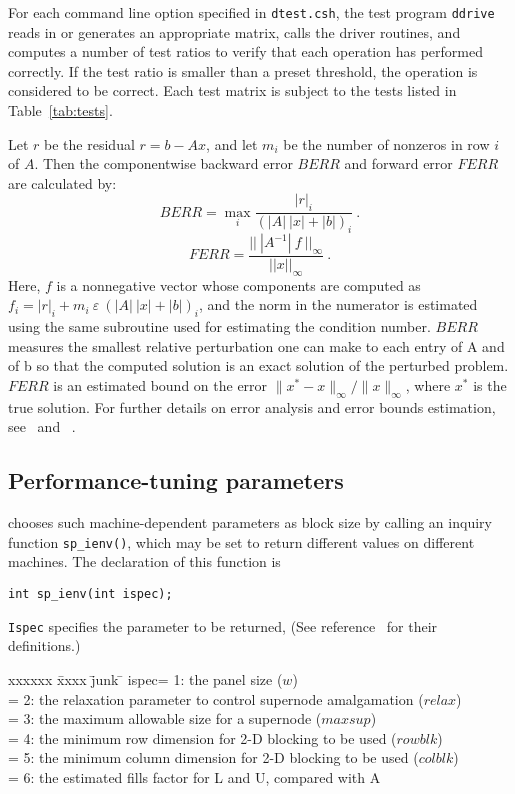 For each command line option specified in {\tt dtest.csh}, the test program
{\tt ddrive} reads in or generates an appropriate matrix, calls the 
driver routines, and computes a number of test ratios to verify that 
each operation has performed correctly. If the test ratio is smaller than
a preset threshold, the operation is considered to be correct.
Each test matrix is subject to the tests listed in Table~\ref{tab:tests}.

Let $r$ be the residual $r=b-Ax$, and let $m_i$ be the number of nonzeros in 
row $i$ of $A$. Then the componentwise backward error $BERR$ and 
forward error $FERR$~\cite{lapackmanual2} are calculated by:
$$ BERR = \max_i\frac{|r|_i}{(|A|~|x|+|b|)_i}\ .$$
$$FERR = \frac{||~|A^{-1}|~f~||_\infty}{||x||_\infty}\ .$$
Here, $f$ is a nonnegative vector whose components are computed as
$f_i=|r|_i + m_i~\varepsilon~(|A|~|x|+|b|)_i$, and the norm in the numerator 
is estimated using the same subroutine used for estimating the
condition number. 
$BERR$ measures the smallest relative perturbation one can make to each 
entry of A and of b so that the computed solution is an exact
solution of the perturbed problem. $FERR$ is an estimated bound on 
the error $\| x^* - x \|_{\infty} / \| x \|_{\infty}$, where $x^*$ is 
the true solution.
For further details on error analysis and error bounds
estimation, see~\cite[Chapter 4]{lapackmanual2} and ~\cite{arioli89}.


\subsection{Performance-tuning parameters}
\label{sec:parameters}
{\SuperLU} chooses such machine-dependent parameters as block size by calling
an inquiry function {\tt sp\_ienv()}, which may be set to return different
values on different machines. The declaration of this function is

\vspace{.1in}
{\tt int sp\_ienv(int ispec);}
\vspace{.1in}

{\tt Ispec} specifies the parameter to be returned,
(See reference~\cite{superlu99} for their definitions.)
\begin{tabbing}
xxxxxx \= xxxx \= junk \= \kill
\>ispec\>= 1: the panel size ($w$)\\
\>     \>= 2: the relaxation parameter to control supernode amalgamation 
              ($relax$)\\
\>     \>= 3: the maximum allowable size for a supernode ($maxsup$)\\
\>     \>= 4: the minimum row dimension for 2-D blocking to be used ($rowblk$)\\
\>     \>= 5: the minimum column dimension for 2-D blocking to be used ($colblk$)\\
\>     \>= 6: the estimated fills factor for L and U, compared with A
\end{tabbing}	    

